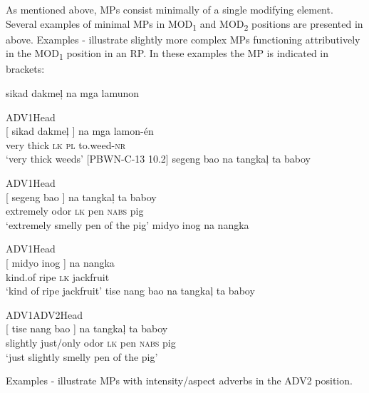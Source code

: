 As mentioned above, MPs consist minimally of a single modifying element. Several examples of minimal MPs in MOD\textsubscript{1} and MOD\textsubscript{2} positions are presented in  above. Examples - illustrate slightly more complex MPs functioning attributively in the MOD\textsubscript{1} position in an RP. In these examples the MP is indicated in brackets:

\ea
\label{bkm:Ref417997093}  
sikad  dakmeļ  na  mga  lamunon \\\smallskip

ADV1\hspace{6pt}Head \\
\gll {}[  sikad  dakmeļ ]  na  mga  lamon-én \\
{}  very  thick  {}  \textsc{lk}  \textsc{pl}  to.weed-\textsc{nr} \\
\glt ‘very thick weeds’ [PBWN-C-13 10.2]
\z
\ea
\label{bkm:Ref418000563}
segeng  bao  na  tangkaļ  ta  baboy \\\smallskip

ADV1\hspace{24pt}Head \\
\gll {}[ segeng  bao ]  na  tangkaļ  ta  baboy \\
{}  extremely  odor {} \textsc{lk}  pen  \textsc{nabs}  pig \\
\glt ‘extremely smelly pen of  the pig’
\z
\ea
\label{bkm:Ref418000663}
midyo  inog  na  nangka \\\smallskip

ADV1\hspace{14pt}Head \\
\gll {}[  midyo  inog ]  na  nangka \\
  {} kind.of  ripe {} \textsc{lk}  jackfruit \\
\glt ‘kind of ripe jackfruit’
\z
\ea
\label{bkm:Ref425693139}\label{bkm:Ref425250007}
tise  nang  bao   na  tangkaļ  ta  baboy \\\smallskip

ADV1\hspace{16pt}ADV2\hspace{16pt}Head \\
\gll {}[ tise  nang  bao  ]  na  tangkaļ  ta  baboy \\
 {} slightly  just/only  odor {}   \textsc{lk}  pen  \textsc{nabs}  pig \\
\glt ‘just slightly smelly pen of the pig’
\z

Examples - illustrate MPs with intensity/aspect adverbs in the ADV2 position.

